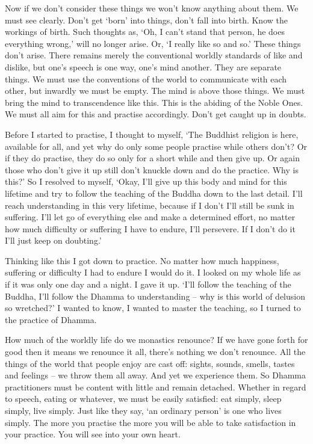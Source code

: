Now if we don't consider these things we won't know anything about them. We must see clearly. Don't get `born' into things, don't fall into birth. Know the workings of birth. Such thoughts as, `Oh, I can't stand that person, he does everything wrong,' will no longer arise. Or, `I really like so and so.' These things don't arise. There remains merely the conventional worldly standards of like and dislike, but one's speech is one way, one's mind another. They are separate things. We must use the conventions of the world to communicate with each other, but inwardly we must be empty. The mind is above those things. We must bring the mind to transcendence like this. This is the abiding of the Noble Ones. We must all aim for this and practise accordingly. Don't get caught up in doubts.

Before I started to practise, I thought to myself, `The Buddhist religion is here, available for all, and yet why do only some people practise while others don't? Or if they do practise, they do so only for a short while and then give up. Or again those who don't give it up still don't knuckle down and do the practice. Why is this?' So I resolved to myself, `Okay, I'll give up this body and mind for this lifetime and try to follow the teaching of the Buddha down to the last detail. I'll reach understanding in this very lifetime, because if I don't I'll still be sunk in suffering. I'll let go of everything else and make a determined effort, no matter how much difficulty or suffering I have to endure, I'll persevere. If I don't do it I'll just keep on doubting.'

Thinking like this I got down to practice. No matter how much happiness, suffering or difficulty I had to endure I would do it. I looked on my whole life as if it was only one day and a night. I gave it up. `I'll follow the teaching of the Buddha, I'll follow the Dhamma to understanding -- why is this world of delusion so wretched?' I wanted to know, I wanted to master the teaching, so I turned to the practice of Dhamma.

How much of the worldly life do we monastics renounce? If we have gone forth for good then it means we renounce it all, there's nothing we don't renounce. All the things of the world that people enjoy are cast off: sights, sounds, smells, tastes and feelings -- we throw them all away. And yet we experience them. So Dhamma practitioners must be content with little and remain detached. Whether in regard to speech, eating or whatever, we must be easily satisfied: eat simply, sleep simply, live simply. Just like they say, `an ordinary person' is one who lives simply. The more you practise the more you will be able to take satisfaction in your practice. You will see into your own heart.

